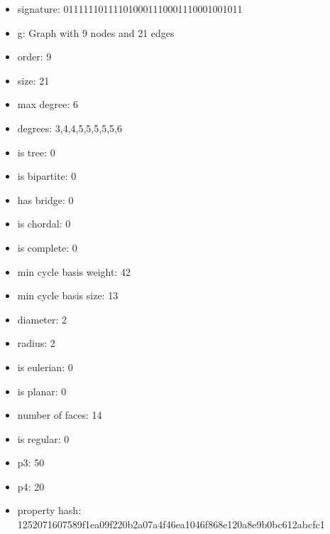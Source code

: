 \newpage
\begin{figure}
\end{figure}
\begin{itemize}
\item signature: 011111101111010001110001110001001011
\item g: Graph with 9 nodes and 21 edges
\item order: 9
\item size: 21
\item max degree: 6
\item degrees: 3,4,4,5,5,5,5,5,6
\item is tree: 0
\item is bipartite: 0
\item has bridge: 0
\item is chordal: 0
\item is complete: 0
\item min cycle basis weight: 42
\item min cycle basis size: 13
\item diameter: 2
\item radius: 2
\item is eulerian: 0
\item is planar: 0
\item number of faces: 14
\item is regular: 0
\item p3: 50
\item p4: 20
\item property hash: 1252071607589f1ea09f220b2a07a4f46ea1046f868e120a8e9b0bc612abcfc1
\end{itemize}
